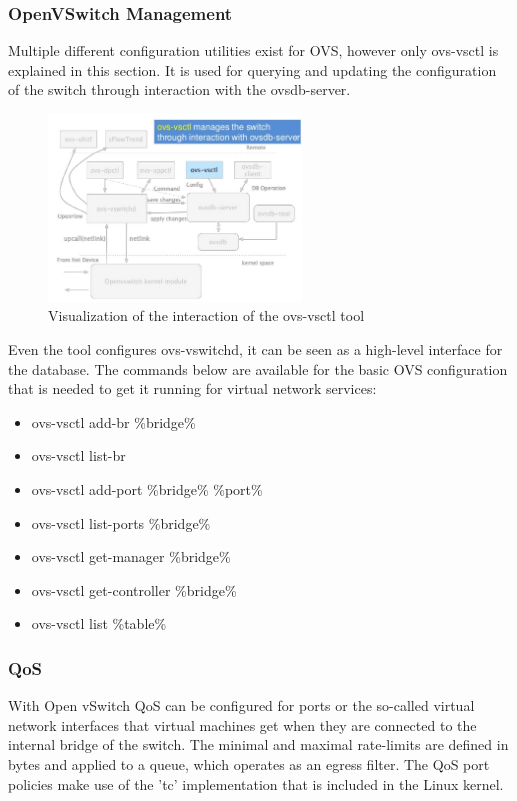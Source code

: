 \subsubsection{OpenVSwitch Management}

Multiple different configuration utilities exist for OVS, however only ovs-vsctl is explained in this section. It is used for querying and updating the configuration of the switch through interaction with the ovsdb-server.

\begin{figure}[H]
\centering
\includegraphics[width=0.6\textwidth]{images/fundamentals/openvswitch_vsctl.png}
\caption{Visualization of the interaction of the ovs-vsctl tool}
\end{figure}

Even the tool configures ovs-vswitchd, it can be seen as a high-level interface for the database.
The commands below are available for the basic OVS configuration that is needed to get it running for virtual network services:
\begin{itemize}
\item ovs-vsctl add-br \%bridge\%
\item ovs-vsctl list-br
\item ovs-vsctl add-port \%bridge\% \%port\%
\item ovs-vsctl list-ports \%bridge\%
\item ovs-vsctl get-manager \%bridge\%
\item ovs-vsctl get-controller \%bridge\%
\item ovs-vsctl list \%table\%
\end{itemize}


\subsubsection{QoS}

With Open vSwitch QoS can be configured for ports or the so-called virtual network interfaces that virtual machines get when they are connected to the internal bridge of the switch. The minimal and maximal rate-limits are defined in bytes and applied to a queue, which operates as an egress filter. The QoS port policies make use of the 'tc' implementation that is included in the Linux kernel.

